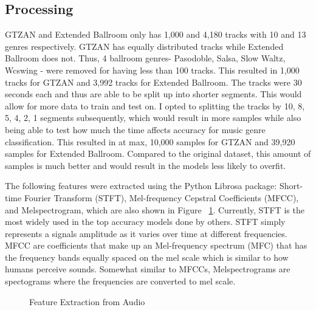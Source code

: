 \documentclass[10pt,twocolumn,letterpaper]{article}
\begin{document}
	\subsection{Processing}
	
	GTZAN and Extended Ballroom only has 1,000 and 4,180 tracks with 10 and 13 genres respectively. GTZAN has equally distributed tracks while Extended Ballroom does not. Thus, 4 ballroom genres- Pasodoble, Salsa, Slow Waltz, Wcswing - were removed for having less than 100 tracks. This resulted in 1,000 tracks for GTZAN and 3,992 tracks for Extended Ballroom. The tracks were 30 seconds each and thus are able to be split up into shorter segments. This would allow for more data to train and test on. I opted to splitting the tracks by 10, 8, 5, 4, 2, 1 segments subsequently, which would result in more samples while also being able to test how much the time affects accuracy for music genre classification. This resulted in at max, 10,000 samples for GTZAN and 39,920 samples for Extended Ballroom. Compared to the original dataset, this amount of samples is much better and would result in the models less likely to overfit.
	
	The following features were extracted using the Python Librosa package: Short-time Fourier Transform (STFT), Mel-frequency Cepstral Coefficients (MFCC), and Melspectrogram, which are also shown in Figure ~\ref{fig:features}. Currently, STFT is the most widely used in the top accuracy models done by others. STFT simply represents a signals amplitude as it varies over time at different frequencies. MFCC are coefficients that make up an Mel-frequency spectrum (MFC) that has the frequency bands equally spaced on the mel scale which is similar to how humans perceive sounds. Somewhat similar to MFCCs, Melspectrograms are spectograms where the frequencies are converted to mel scale.
	
	\begin{figure}[!htpb]
		\centering
		\qquad
		
		\caption{Feature Extraction from Audio}
		\label{fig:features}
	\end{figure}
	
\end{document}

